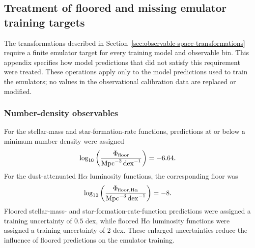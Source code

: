 \documentclass[twocolumn, apj, numberedappendix, iop]{openjournal}
\newcommand{\ha}{H$\alpha$}
\begin{document}
%


\subsection{Treatment of floored and missing emulator training targets}
\label{app:missing-values}

The transformations described in
Section~\ref{sec:observable-space-transformations} require a finite emulator
target for every training model and observable bin. This appendix specifies
how model predictions that did not satisfy this requirement were treated.
These operations apply only to the model predictions used to train the emulators; no values in the observational calibration data are replaced or modified.

\subsubsection{Number-density observables}

For the stellar-mass and star-formation-rate functions, predictions at or below
a minimum number density were assigned
\[
  \log_{10}\left(
    \frac{\Phi_{\rm floor}}
         {{\rm Mpc}^{-3}\,{\rm dex}^{-1}}
  \right)
  = -6.64.
\]
For the dust-attenuated \ha{} luminosity functions, the corresponding floor was
\[
  \log_{10}\left(
    \frac{\Phi_{{\rm floor},{\rm H}\alpha}}
         {{\rm Mpc}^{-3}\,{\rm dex}^{-1}}
  \right)
  = -8.
\]
Floored stellar-mass- and star-formation-rate-function predictions were
assigned a training uncertainty of \(0.5\) dex, while floored \ha{} luminosity
functions were assigned a training uncertainty of \(2\) dex. These enlarged uncertainties reduce the influence of floored predictions on the emulator training.
\end{document}
